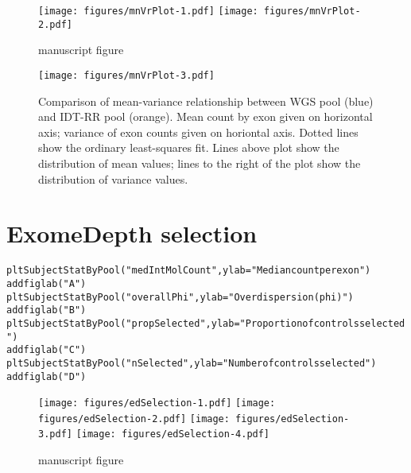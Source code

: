 \documentclass{article}\usepackage[]{graphicx}\usepackage[]{color}
\makeatletter
\newcommand{\hlstr}[1]{\textcolor[rgb]{0.063,0.58,0.627}{#1}}%
\newcommand{\hlstd}[1]{\textcolor[rgb]{0.196,0.196,0.196}{#1}}%
\newcommand{\hlkwc}[1]{\textcolor[rgb]{0,0.631,0.314}{#1}}%
\newcommand{\hlkwd}[1]{\textcolor[rgb]{0.78,0.227,0.412}{#1}}%
\newenvironment{kframe}{%
 \def\at@end@of@kframe{}%
 \ifinner\ifhmode%
  \def\at@end@of@kframe{\end{minipage}}%
  \begin{minipage}{\columnwidth}%
 \fi\fi%
 \def\FrameCommand##1{\hskip\@totalleftmargin \hskip-\fboxsep
 \colorbox{shadecolor}{##1}\hskip-\fboxsep
     \hskip-\linewidth \hskip-\@totalleftmargin \hskip\columnwidth}%
 \MakeFramed {\advance\hsize-\width
   \@totalleftmargin\z@ \linewidth\hsize
   \@setminipage}}%
 {\par\unskip\endMakeFramed%
 \at@end@of@kframe}
\newenvironment{knitrout}{}{} %
\makeatother
\begin{document}
\begin{figure}[H]
  \centering
  \texttt{[image: figures/mnVrPlot-1.pdf]}%
  \texttt{[image: figures/mnVrPlot-2.pdf]}
  \caption{manuscript figure}
\end{figure}

\begin{figure}[H]
  \centering
  \texttt{[image: figures/mnVrPlot-3.pdf]}%
  \caption{Comparison of mean-variance relationship between WGS pool (blue) and IDT-RR pool (orange). Mean count by exon given on horizontal axis; variance of exon counts given on horiontal axis. Dotted lines show the ordinary least-squares fit. Lines above plot show the distribution of mean values; lines to the right of the plot show the distribution of variance values.}
\end{figure}

\newpage
\section{ExomeDepth selection}

\begin{knitrout}
\color{fgcolor}\begin{kframe}
\begin{alltt}
\hlkwd{pltSubjectStatByPool}\hlstd{(}\hlstr{"medIntMolCount"}\hlstd{,} \hlkwc{ylab} \hlstd{=} \hlstr{"Median count per exon"}\hlstd{)}
\hlkwd{addfiglab}\hlstd{(}\hlstr{"A"}\hlstd{)}
\hlkwd{pltSubjectStatByPool}\hlstd{(}\hlstr{"overallPhi"}\hlstd{,} \hlkwc{ylab} \hlstd{=} \hlstr{"Overdispersion (phi)"}\hlstd{)}
\hlkwd{addfiglab}\hlstd{(}\hlstr{"B"}\hlstd{)}
\hlkwd{pltSubjectStatByPool}\hlstd{(}\hlstr{"propSelected"}\hlstd{,} \hlkwc{ylab} \hlstd{=} \hlstr{"Proportion of controls selected"}\hlstd{)}
\hlkwd{addfiglab}\hlstd{(}\hlstr{"C"}\hlstd{)}
\hlkwd{pltSubjectStatByPool}\hlstd{(}\hlstr{"nSelected"}\hlstd{,} \hlkwc{ylab} \hlstd{=} \hlstr{"Number of controls selected"}\hlstd{)}
\hlkwd{addfiglab}\hlstd{(}\hlstr{"D"}\hlstd{)}
\end{alltt}
\end{kframe}
\end{knitrout}

\begin{figure}[H]
  \centering
  \texttt{[image: figures/edSelection-1.pdf]}%
  \texttt{[image: figures/edSelection-2.pdf]}
  \texttt{[image: figures/edSelection-3.pdf]}%
  \texttt{[image: figures/edSelection-4.pdf]}
  \caption{manuscript figure}
\end{figure}
\end{document}
